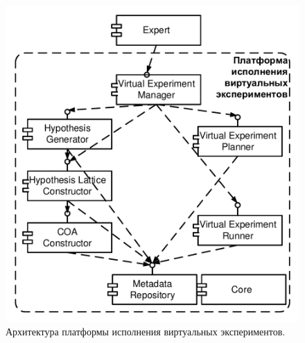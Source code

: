 \begin{figure}[h!]
    \centering
    \includegraphics[width=0.7\linewidth]{images/arch_v4.pdf}
    \caption{Архитектура платформы исполнения виртуальных экспериментов.}\label{fig:arch}
\end{figure}

